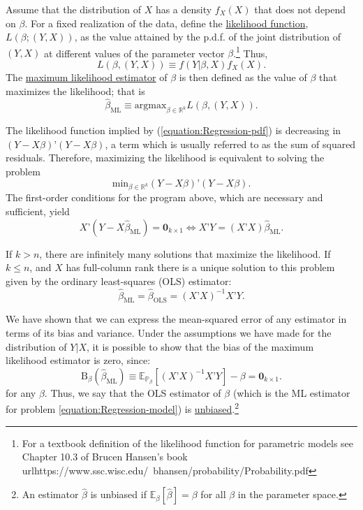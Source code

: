\documentclass[11pt]{article} %
\begin{document}
Assume that the distribution of $X$ has a density $f_{X}(X)$ that does not depend on $\beta$. For a fixed realization of the data, define the \underline{likelihood function}, $L(\beta; (Y,X))$, as the value attained by the p.d.f. of the joint distribution of $(Y,X)$ at different values of the parameter vector $\beta$.\footnote{For a textbook definition of the likelihood function for parametric models see Chapter 10.3 of Brucen Hansen's book url{https://www.ssc.wisc.edu/~bhansen/probability/Probability.pdf}} Thus,
\[ L(\beta, (Y,X)) \equiv f(Y | \beta, X )f_X(X). \]
The \underline{maximum likelihood estimator} of $\beta$ is then defined as the value of $\beta$ that maximizes the likelihood; that is
\[ \widehat{\beta}_{\textrm{ML}} \equiv \textrm{argmax}_{\beta \in \mathbb{R}^{k}} L(\beta, (Y,X)).   \]




\noindent The likelihood function implied by (\ref{equation:Regression-pdf}) is decreasing in $(Y-X\beta)’(Y-X\beta)$, a term which is usually referred to as the sum of squared residuals. Therefore, maximizing the likelihood is equivalent to solving the problem
\[ \textrm{min}_{\beta \in \mathbb{R}^{k}} (Y-X\beta)’(Y-X\beta).   \]
The first-order conditions for the program above, which are necessary and sufficient, yield
\[ X’(Y-X\widehat{\beta}_{\textrm{ML}}) = \textbf{0}_{k \times 1} \iff X’Y = (X’X) \widehat{\beta}_{\textrm{ML}}. \]

\noindent If $k > n$, there are infinitely many solutions that maximize the likelihood.  If $k \leq n$, and $X$ has full-column rank there is a unique solution to this problem given by the ordinary least-squares (OLS) estimator:
\begin{equation} \label{equation:OLS}
\widehat{\beta}_{\textrm{ML}} = \widehat{\beta}_{\textrm{OLS}} = (X’X)^{-1} X’Y.
\end{equation}

 We have shown that we can express the mean-squared error of any estimator in terms of its bias and variance. Under the assumptions we have made for the distribution of $Y|X$, it is possible to show that the bias of the maximum likelihood estimator is zero, since:
\begin{equation} \label{equation:bias}
\textrm{B}_{\beta}(\widehat{\beta}_{\textrm{ML}}) \equiv \mathbb{E}_{\mathbb{P}_{\beta}} [ (X’X)^{-1} X’Y ] - \beta = \mathbf{0}_{k \times 1}.
\end{equation}
for any $\beta$. Thus, we say that the OLS estimator of $\beta$ (which is the ML estimator for problem \eqref{equation:Regression-model}) is \underline{unbiased}.\footnote{An estimator $\widehat{\beta}$ is unbiased if $\mathbb{E}_{\beta} [\widehat{\beta}] = \beta$ for all $\beta$ in the parameter space.} 
\end{document}

